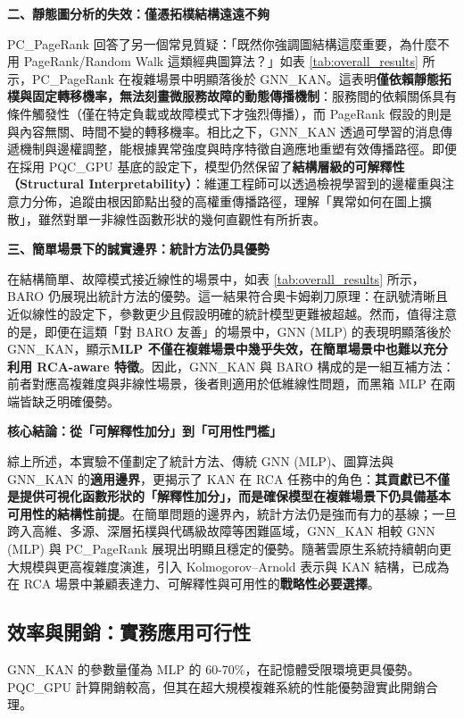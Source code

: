 \documentclass[10pt,a4paper,twocolumn]{article}
\begin{document}
\textbf{二、靜態圖分析的失效：僅憑拓樸結構遠遠不夠}

PC\_PageRank 回答了另一個常見質疑：「既然你強調圖結構這麼重要，為什麼不用 PageRank/Random Walk 這類經典圖算法？」如表 \ref{tab:overall_results} 所示，PC\_PageRank 在複雜場景中明顯落後於 GNN\_KAN。這表明\textbf{僅依賴靜態拓樸與固定轉移機率，無法刻畫微服務故障的動態傳播機制}：服務間的依賴關係具有條件觸發性（僅在特定負載或故障模式下才強烈傳播），而 PageRank 假設的則是與內容無關、時間不變的轉移機率。相比之下，GNN\_KAN 透過可學習的消息傳遞機制與邊權調整，能根據異常強度與時序特徵自適應地重塑有效傳播路徑。即便在採用 PQC\_GPU 基底的設定下，模型仍然保留了\textbf{結構層級的可解釋性（Structural Interpretability）}：維運工程師可以透過檢視學習到的邊權重與注意力分佈，追蹤由根因節點出發的高權重傳播路徑，理解「異常如何在圖上擴散」，雖然對單一非線性函數形狀的幾何直觀性有所折衷。

\textbf{三、簡單場景下的誠實邊界：統計方法仍具優勢}

在結構簡單、故障模式接近線性的場景中，如表 \ref{tab:overall_results} 所示，BARO 仍展現出統計方法的優勢。這一結果符合奧卡姆剃刀原理：在訊號清晰且近似線性的設定下，參數更少且假設明確的統計模型更難被超越。然而，值得注意的是，即便在這類「對 BARO 友善」的場景中，GNN (MLP) 的表現明顯落後於 GNN\_KAN，顯示\textbf{MLP 不僅在複雜場景中幾乎失效，在簡單場景中也難以充分利用 RCA-aware 特徵}。因此，GNN\_KAN 與 BARO 構成的是一組互補方法：前者對應高複雜度與非線性場景，後者則適用於低維線性問題，而黑箱 MLP 在兩端皆缺乏明確優勢。

\textbf{核心結論：從「可解釋性加分」到「可用性門檻」}

綜上所述，本實驗不僅劃定了統計方法、傳統 GNN (MLP)、圖算法與 GNN\_KAN 的\textbf{適用邊界}，更揭示了 KAN 在 RCA 任務中的角色：\textbf{其貢獻已不僅是提供可視化函數形狀的「解釋性加分」，而是確保模型在複雜場景下仍具備基本可用性的結構性前提}。在簡單問題的邊界內，統計方法仍是強而有力的基線；一旦跨入高維、多源、深層拓樸與代碼級故障等困難區域，GNN\_KAN 相較 GNN (MLP) 與 PC\_PageRank 展現出明顯且穩定的優勢。隨著雲原生系統持續朝向更大規模與更高複雜度演進，引入 Kolmogorov–Arnold 表示與 KAN 結構，已成為在 RCA 場景中兼顧表達力、可解釋性與可用性的\textbf{戰略性必要選擇}。

\subsection{效率與開銷：實務應用可行性}

GNN\_KAN 的參數量僅為 MLP 的 60-70\%，在記憶體受限環境更具優勢。PQC\_GPU 計算開銷較高，但其在超大規模複雜系統的性能優勢證實此開銷合理。
\end{document}
